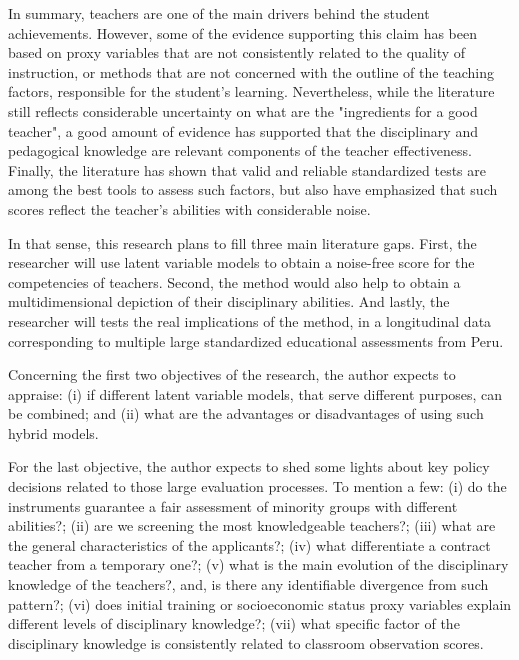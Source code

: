 In summary, teachers are one of the main drivers behind the student achievements. However, some of the evidence supporting this claim has been based on proxy variables that are not consistently related to the quality of instruction, or methods that are not concerned with the outline of the teaching factors, responsible for the student's learning. Nevertheless, while the literature still reflects considerable uncertainty on what are the "ingredients for a good teacher", a good amount of evidence has supported that the disciplinary and pedagogical knowledge are relevant components of the teacher effectiveness. Finally, the literature has shown that valid and reliable standardized tests are among the best tools to assess such factors, but also have emphasized that such scores reflect the teacher's abilities with considerable noise.

In that sense, this research plans to fill three main literature gaps. First, the researcher will use latent variable models to obtain a noise-free score for the competencies of teachers. Second, the method would also help to obtain a multidimensional depiction of their disciplinary abilities. And lastly, the researcher will tests the real implications of the method, in a longitudinal data corresponding to multiple large standardized educational assessments from Peru. 

Concerning the first two objectives of the research, the author expects to appraise: (i) if different latent variable models, that serve different purposes, can be combined; and (ii) what are the advantages or disadvantages of using such hybrid models.

For the last objective, the author expects to shed some lights about key policy decisions related to those large evaluation processes. To mention a few: (i) do the instruments guarantee a fair assessment of minority groups with different abilities?; (ii) are we screening the most knowledgeable teachers?; (iii) what are the general characteristics of the applicants?; (iv) what differentiate a contract teacher from a temporary one?; (v) what is the main evolution of the disciplinary knowledge of the teachers?, and, is there any identifiable divergence from such pattern?; (vi) does initial training or socioeconomic status proxy variables explain different levels of disciplinary knowledge?; (vii) what specific factor of the disciplinary knowledge is consistently related to classroom observation scores.



